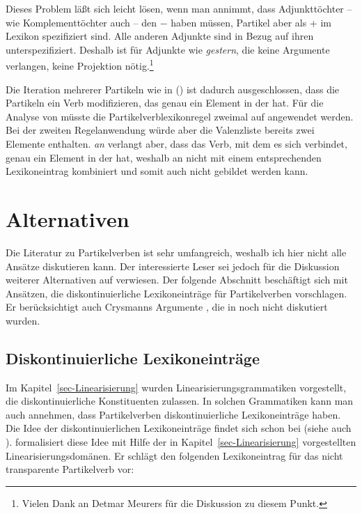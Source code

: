 Dieses Problem läßt sich leicht lösen,
wenn man annimmt, dass Adjunkttöchter -- wie Komplementtöchter auch -- den \lexw{} $-$ haben
müssen, Partikel aber als \lex+ im Lexikon spezifiziert sind. Alle anderen Adjunkte
sind in Bezug auf ihren \lexw unterspezifiziert. Deshalb ist für Adjunkte wie \emph{gestern},
die keine Argumente verlangen, keine Projektion nötig.\footnote{
        Vielen Dank an Detmar Meurers für die Diskussion zu diesem Punkt.%
}

Die Iteration mehrerer Partikeln wie in () ist dadurch ausgeschlossen, dass die Partikeln ein
Verb modifizieren, das genau ein Element in der \compsl hat.
\z
Für die Analyse von  müsste die Partikelverblexikonregel zweimal auf 
angewendet werden. Bei der zweiten Regelanwendung würde aber die Valenzliste bereits zwei Elemente
enthalten. \emph{an} verlangt aber, dass das Verb, mit dem es sich verbindet, genau ein Element in
der \compsl hat, weshalb an nicht mit einem entsprechenden Lexikoneintrag kombiniert und
 somit auch nicht gebildet werden kann.

\section{Alternativen}

Die Literatur zu Partikelverben ist sehr umfangreich, weshalb ich hier nicht alle Ansätze diskutieren
kann. Der interessierte Leser sei jedoch für die Diskussion weiterer Alternativen auf
 verwiesen. Der folgende Abschnitt beschäftigt sich mit
Ansätzen, die diskontinuierliche Lexikoneinträge für Partikelverben vorschlagen. Er berücksichtigt
auch Crysmanns Argumente \citeyearpar{Crysmann2002a}, die in  noch nicht
diskutiert wurden.

\subsection{Diskontinuierliche Lexikoneinträge}
\label{sec-disc-entry}

Im Kapitel~\ref{sec-Linearisierung} wurden Linearisierungsgrammatiken vorgestellt, die
diskontinuierliche Konstituenten zulassen. In solchen Grammatiken kann man auch annehmen,
dass Partikelverben diskontinuierliche Lexikoneinträge haben. Die Idee der diskontinuierlichen
Lexikoneinträge findet sich schon bei \citet[]{Wells47a} (siehe auch ).
\citet*[--248]{Kathol95a} formalisiert diese Idee mit Hilfe
der in Kapitel~\ref{sec-Linearisierung} vorgestellten Linearisierungsdomänen.
Er schlägt den folgenden Lexikoneintrag für das nicht transparente Partikelverb  
vor:

